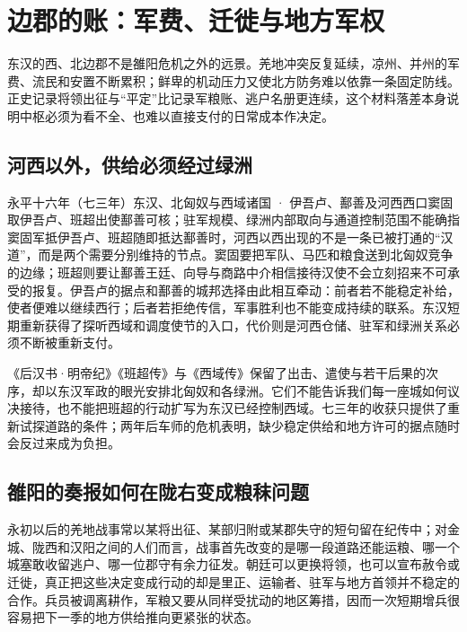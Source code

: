 \section{边郡的账：军费、迁徙与地方军权}
\label{sec:eastern-han-frontier-fiscal}

东汉的西、北边郡不是雒阳危机之外的远景。羌地冲突反复延续，凉州、并州的军费、流民和安置不断累积；鲜卑的机动压力又使北方防务难以依靠一条固定防线。正史记录将领出征与“平定”比记录军粮账、逃户名册更连续，这个材料落差本身说明中枢必须为看不全、也难以直接支付的日常成本作决定。

\subsection{河西以外，供给必须经过绿洲}

\begin{event}{}{永平十六年（七三年）}{东汉、北匈奴与西域诸国 · 伊吾卢、鄯善及河西西口}{窦固取伊吾卢、班超出使鄯善可核；驻军规模、绿洲内部取向与通道控制范围不能确指}
窦固军抵伊吾卢、班超随即抵达鄯善时，河西以西出现的不是一条已被打通的“汉道”，而是两个需要分别维持的节点。窦固要把军队、马匹和粮食送到北匈奴竞争的边缘；班超则要让鄯善王廷、向导与商路中介相信接待汉使不会立刻招来不可承受的报复。伊吾卢的据点和鄯善的城邦选择由此相互牵动：前者若不能稳定补给，使者便难以继续西行；后者若拒绝传信，军事胜利也不能变成持续的联系。东汉短期重新获得了探听西域和调度使节的入口，代价则是河西仓储、驻军和绿洲关系必须不断被重新支付。

《后汉书·明帝纪》《班超传》与《西域传》保留了出击、遣使与若干后果的次序，却以东汉军政的眼光安排北匈奴和各绿洲。它们不能告诉我们每一座城如何议决接待，也不能把班超的行动扩写为东汉已经控制西域。七三年的收获只提供了重新试探道路的条件；两年后车师的危机表明，缺少稳定供给和地方许可的据点随时会反过来成为负担。
\end{event}

\subsection{雒阳的奏报如何在陇右变成粮秣问题}

永初以后的羌地战事常以某将出征、某部归附或某郡失守的短句留在纪传中；对金城、陇西和汉阳之间的人们而言，战事首先改变的是哪一段道路还能运粮、哪一个城塞敢收留逃户、哪一位郡守有余力征发。朝廷可以更换将领，也可以宣布赦令或迁徙，真正把这些决定变成行动的却是里正、运输者、驻军与地方首领并不稳定的合作。兵员被调离耕作，军粮又要从同样受扰动的地区筹措，因而一次短期增兵很容易把下一季的地方供给推向更紧张的状态。

